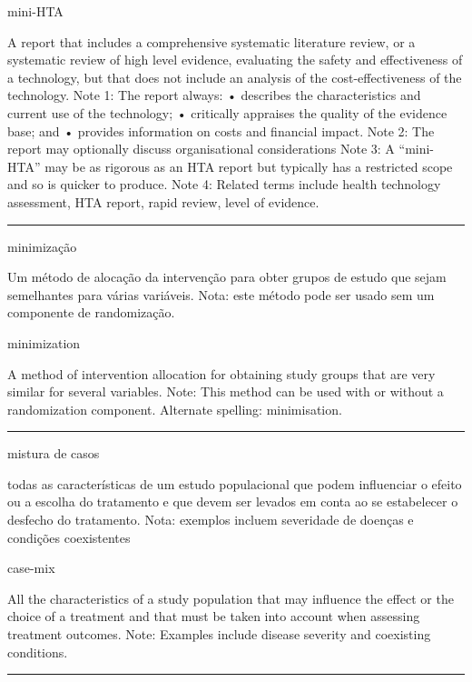 \documentclass[
]{book}
\begin{document}
mini-HTA

A report that includes a comprehensive systematic literature review, or a systematic review of high level evidence, evaluating the safety and effectiveness of a technology, but that does not include an analysis of the cost-effectiveness of the technology. Note 1: The report always:
• describes the characteristics and current use of the technology;
• critically appraises the quality of the evidence base; and
• provides information on costs and financial impact. Note 2: The report may optionally discuss organisational considerations Note 3: A ``mini-HTA'' may be as rigorous as an HTA report but typically has a restricted scope and so is quicker to produce. Note 4: Related terms include health technology assessment, HTA report, rapid review, level of evidence.

\begin{center}\rule{0.5\linewidth}{0.5pt}\end{center}

minimização

Um método de alocação da intervenção para obter grupos de estudo que sejam semelhantes para várias variáveis. Nota: este método pode ser usado sem um componente de randomização.

minimization

A method of intervention allocation for obtaining study groups that are very similar for several variables. Note: This method can be used with or without a randomization component. Alternate spelling: minimisation.

\begin{center}\rule{0.5\linewidth}{0.5pt}\end{center}

mistura de casos

todas as características de um estudo populacional que podem influenciar o efeito ou a escolha do tratamento e que devem ser levados em conta ao se estabelecer o desfecho do tratamento. Nota: exemplos incluem severidade de doenças e condições coexistentes

case-mix

All the characteristics of a study population that may influence the effect or the choice of a treatment and that must be taken into account when assessing treatment outcomes. Note: Examples include disease severity and coexisting conditions.

\begin{center}\rule{0.5\linewidth}{0.5pt}\end{center}
\end{document}
